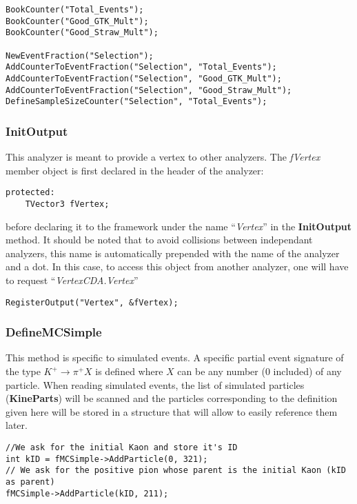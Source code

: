 \documentclass{article}
\newcommand{\method}[1]{\textbf{#1}}
\newcommand{\var}[1]{\textit{#1}}
\newcommand{\class}[1]{\textbf{#1}}
\newcommand{\refcode}[1]{``\textit{#1}''}
\begin{document}
\begin{lstlisting}
BookCounter("Total_Events");
BookCounter("Good_GTK_Mult");
BookCounter("Good_Straw_Mult");

NewEventFraction("Selection");
AddCounterToEventFraction("Selection", "Total_Events");
AddCounterToEventFraction("Selection", "Good_GTK_Mult");
AddCounterToEventFraction("Selection", "Good_Straw_Mult");
DefineSampleSizeCounter("Selection", "Total_Events");
\end{lstlisting} 

\subsubsection{InitOutput}
This analyzer is meant to provide a vertex to other analyzers. The \var{fVertex} member object is
first declared in the header of the analyzer:

\begin{lstlisting}
protected:
	TVector3 fVertex;
\end{lstlisting}
before declaring it to the framework under the name \refcode{Vertex} in the \method{InitOutput}
method. It should be noted that to avoid collisions between independant analyzers, this name is
automatically prepended with the name of the analyzer and a dot. In this case, to access this
object from another analyzer, one will have to request \refcode{VertexCDA.Vertex}

\begin{lstlisting}
RegisterOutput("Vertex", &fVertex);
\end{lstlisting}

\subsubsection{DefineMCSimple}
This method is specific to simulated events. A specific partial event signature of the type
$K^+\to\pi^+X$ is defined where $X$ can be any number (0 included) of any particle. When reading
simulated events, the list of simulated particles (\class{KineParts}) will be scanned and the
particles corresponding to the definition given here will be stored in a structure that will allow
to easily reference them later.

\begin{lstlisting}
//We ask for the initial Kaon and store it's ID
int kID = fMCSimple->AddParticle(0, 321);
// We ask for the positive pion whose parent is the initial Kaon (kID as parent)
fMCSimple->AddParticle(kID, 211);
\end{lstlisting}
\end{document}
